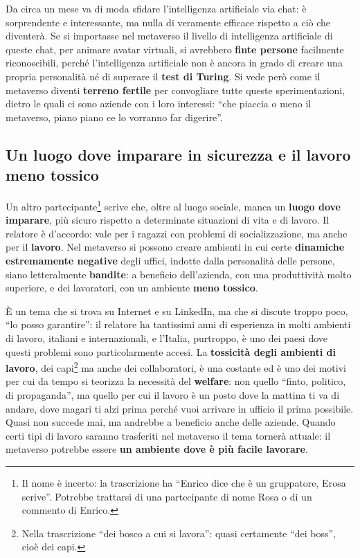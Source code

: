 Da circa un mese va di moda sfidare l'intelligenza artificiale via chat: è
sorprendente e interessante, ma nulla di veramente efficace rispetto a ciò che
diventerà. Se si importasse nel metaverso il livello di intelligenza artificiale
di queste chat, per animare avatar virtuali, si avrebbero \textbf{finte persone}
facilmente riconoscibili, perché l'intelligenza artificiale non è ancora in
grado di creare una propria personalità né di superare il \textbf{test di
Turing}. Si vede però come il metaverso diventi \textbf{terreno fertile} per
convogliare tutte queste sperimentazioni, dietro le quali ci sono aziende con i
loro interessi: ``che piaccia o meno il metaverso, piano piano ce lo vorranno far
digerire''.

\subsection{Un luogo dove imparare in sicurezza e il lavoro meno tossico}

Un altro partecipante\footnote{Il nome è incerto: la trascrizione ha ``Enrico
dice che è un gruppatore, Erosa scrive''. Potrebbe trattarsi di una
partecipante di nome Rosa o di un commento di Enrico.} scrive che, oltre al luogo
sociale, manca un \textbf{luogo dove imparare}, più sicuro rispetto a determinate
situazioni di vita e di lavoro. Il relatore è d'accordo: vale per i ragazzi con
problemi di socializzazione, ma anche per il \textbf{lavoro}. Nel metaverso si
possono creare ambienti in cui certe \textbf{dinamiche estremamente negative}
degli uffici, indotte dalla personalità delle persone, siano letteralmente
\textbf{bandite}: a beneficio dell'azienda, con una produttività molto superiore,
e dei lavoratori, con un ambiente \textbf{meno tossico}.

È un tema che si trova su Internet e su LinkedIn, ma che si discute troppo poco,
``lo posso garantire'': il relatore ha tantissimi anni di esperienza in molti
ambienti di lavoro, italiani e internazionali, e l'Italia, purtroppo, è uno dei
paesi dove questi problemi sono particolarmente accesi. La \textbf{tossicità
degli ambienti di lavoro}, dei capi\footnote{Nella trascrizione ``dei bosco a
cui si lavora'': quasi certamente ``dei boss'', cioè dei capi.} ma anche dei
collaboratori, è una costante ed è uno dei motivi per cui da tempo si teorizza
la necessità del \textbf{welfare}: non quello ``finto, politico, di
propaganda'', ma quello per cui il lavoro è un posto dove la mattina ti va di
andare, dove magari ti alzi prima perché vuoi arrivare in ufficio il prima
possibile. Quasi non succede mai, ma andrebbe a beneficio anche delle aziende.
Quando certi tipi di lavoro saranno trasferiti nel metaverso il tema tornerà
attuale: il metaverso potrebbe essere \textbf{un ambiente dove è più facile
lavorare}.

